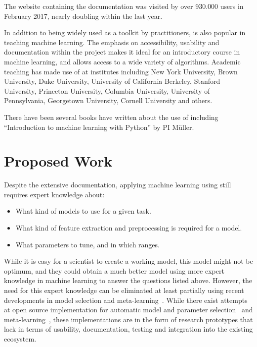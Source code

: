 The \sklearn{} website containing the documentation was visited by over
930.000 users in February 2017, nearly doubling within the last year.

In addition to being widely used as a toolkit by practitioners,
\sklearn{} is also popular in teaching machine learning.
The emphasis on accessibility, usability and documentation within
the \sklearn{} project makes it ideal for an introductory
course in machine learning, and allows access to a wide variety
of algorithms.
Academic teaching has made use of \sklearn{} at institutes including New York
University, Brown University, Duke University, University of California
Berkeley, Stanford University, Princeton University, Columbia University,
University of Pennsylvania, Georgetown University, Cornell University and
others.

There have been several books have written about the use of
\sklearn{} including ``Introduction to machine learning with Python'' by PI
M\"uller.~\autocite{garreta2013learning, hackeling2014mastering,
hauck2014scikit, raschka2015python} 

\section{Proposed Work}
Despite the extensive documentation, applying machine learning using \sklearn{}
still requires expert knowledge about:
\begin{itemize}
    \item What kind of models to use for a given task.
    \item What kind of feature extraction and preprocessing is required for a model.
    \item What parameters to tune, and in which ranges.
\end{itemize}

While it is easy for a scientist to create a working model, this model might not
be optimum, and they could obtain a much better model using more expert knowledge
in machine learning to answer the questions listed above.
However, the need for this expert knowledge can be eliminated at least partially
using recent developments in model selection and
meta-learning~\autocite{NIPS2011_4443, feurer-nips2015,
snoek2015scalable, NIPS2012_4522}. While there exist attempts at
open source implementation for automatic model and parameter
selection~\autocite{bergstra2013hyperopt, komer2014hyperopt,
NIPS2012_4522, hutter2011sequential} and
meta-learning~\autocite{feurer-nips2015}, these implementations are
in the form of research prototypes that lack in terms of usability,
documentation, testing and integration into the existing
ecosystem.

